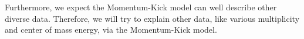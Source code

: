 \documentclass[jkps,fleqn,showpacs,showkeys]{revtex4}
\begin{document}

Furthermore, we expect the Momentum-Kick model can well describe other diverse data.
Therefore, we will try to explain other data, like various multiplicity and center of mass energy, via the Momentum-Kick model.

\end{document}
